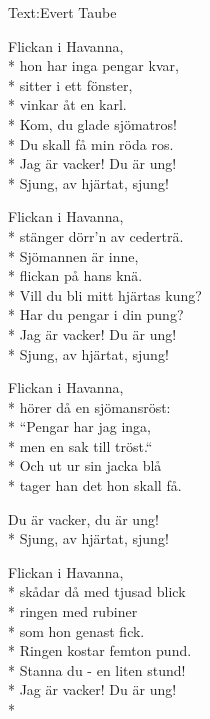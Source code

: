 \begin{SongText}
\begin{SongInfo}
    Text:Evert Taube
\end{SongInfo}
\begin{SongVerse}
Flickan i Havanna,\\*%
hon har inga pengar kvar,\\*%
sitter i ett fönster,\\*%
vinkar åt en karl.\\*%
Kom, du glade sjömatros!\\*%
Du skall få min röda ros.\\*%
Jag är vacker! Du är ung!\\*%
Sjung, av hjärtat, sjung!
\end{SongVerse}
\begin{SongVerse}
Flickan i Havanna,\\*%
stänger dörr’n av cederträ.\\*%
Sjömannen är inne,\\*%
flickan på hans knä.\\*%
Vill du bli mitt hjärtas kung?\\*%
Har du pengar i din pung?\\*%
Jag är vacker! Du är ung!\\*%
Sjung, av hjärtat, sjung!
\end{SongVerse}
\begin{SongVerse}
Flickan i Havanna,\\*%
hörer då en sjömansröst:\\*%
“Pengar har jag inga,\\*%
men en sak till tröst.“\\*%
Och ut ur sin jacka blå\\*%
tager han det hon skall få.
\end{SongVerse}
\begin{SongVerse}
Du är vacker, du är ung!\\*%
Sjung, av hjärtat, sjung!
\end{SongVerse}
\begin{SongVerse}
Flickan i Havanna,\\*%
skådar då med tjusad blick\\*%
ringen med rubiner\\*%
som hon genast fick.\\*%
Ringen kostar femton pund.\\*%
Stanna du - en liten stund!\\*%
Jag är vacker! Du är ung!\\*%

\end{SongVerse}
\end{SongText}
